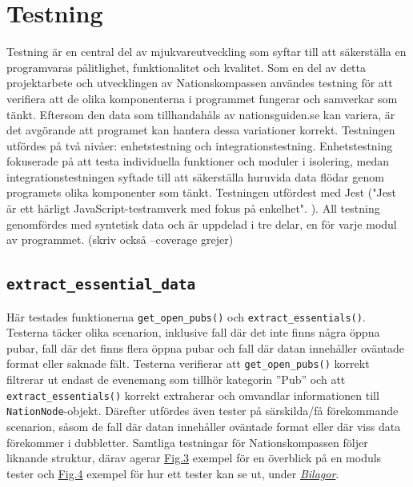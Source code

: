 \documentclass[a4paper, 12pt]{article}
\begin{document}
\section{Testning}
    Testning är en central del av mjukvareutveckling som syftar till att säkerställa en programvaras pålitlighet, funktionalitet och kvalitet. Som en del av detta projektarbete och utvecklingen av Nationskompassen användes testning för att verifiera att de olika komponenterna i programmet fungerar och samverkar som tänkt. Eftersom den data som tillhandahåls av nationsguiden.se kan variera, är det avgörande att programet kan hantera dessa variationer korrekt. Testningen utfördes på två nivåer: enhetstestning och integrationstestning. Enhetstestning fokuserade på att testa individuella funktioner och moduler i isolering, medan integrationstestningen syftade till att säkerställa huruvida data flödar genom programets olika komponenter som tänkt. Testningen utfördest med Jest ("Jest är ett härligt JavaScript-testramverk med fokus på enkelhet". \cite{jest}). All testning genomfördes med syntetisk data och är uppdelad i tre delar, en för varje modul av programmet. (skriv också --coverage grejer)

    \subsection{\texttt{extract\_essential\_data}}
    \label{subsec: extract_essential_data}
        Här testades funktionerna \texttt{get\_open\_pubs()} och \texttt{extract\_essentials()}. Testerna täcker olika scenarion, inklusive fall där det inte finns några öppna pubar, fall där det finns flera öppna pubar och fall där datan innehåller oväntade format eller saknade fält. Testerna verifierar att \texttt{get\_open\_pubs()} korrekt filtrerar ut endast de evenemang som tillhör kategorin ''Pub'' och att \texttt{extract\_essentials()} korrekt extraherar och omvandlar informationen till \texttt{NationNode}-objekt. Därefter utfördes även tester på särskilda/få förekommande scenarion, såsom de fall där datan innehåller oväntade format eller där viss data förekommer i dubbletter. Samtliga testningar för Nationskompassen följer liknande struktur, därav agerar \hyperref[fig: overview_tests]{Fig.3} exempel för en överblick på en moduls tester och \hyperref[fig: example_tests]{Fig.4} exempel för hur ett tester kan se ut, under \hyperref[sec: bilagor]{\textit{Bilagor}}.
\end{document}

